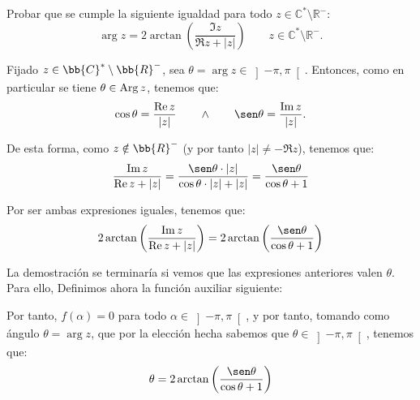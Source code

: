 \begin{ejercicio}
    Probar que se cumple la siguiente igualdad para todo $z \in \mathbb{C}^\ast \setminus \mathbb{R}^-$:
    \[
        \arg z = 2\arctan\left(\dfrac{\Im z}{\Re z + |z|}\right)\qquad z\in \mathbb{C}^\ast \setminus \mathbb{R}^-.
    \]

    Fijado $z\in \bb{C}^*\setminus \bb{R}^-$, sea $\theta=\arg z\in \left]-\pi,\pi\right[$. Entonces, como en particular se tiene $\theta\in\operatorname{Arg} z$, tenemos que:
    \begin{equation*}
        \cos\theta = \dfrac{\Re z}{|z|} \qquad \land \qquad \sen\theta = \dfrac{\Im z}{|z|}.
    \end{equation*}
    \begin{comment}
    \begin{equation*}
        \left\{
            \begin{array}{c}
                \cos\theta = \dfrac{\Re z}{|z|} \\ \land \\ \sen\theta = \dfrac{\Im z}{|z|}.
            \end{array}
        \right\}
        \Longleftrightarrow \theta\in \Arg z
    \end{equation*}
    \end{comment}

    De esta forma, como $z\notin \bb{R}^-$ (y por tanto $|z|\neq -\Re z$), tenemos que:
    \begin{align*}
        \dfrac{\Im z}{\Re z + |z|}
        = \dfrac{\sen\theta\cdot |z|}{\cos\theta\cdot |z| + |z|}
        = \dfrac{\sen\theta}{\cos\theta + 1}
    \end{align*}

    Por ser ambas expresiones iguales, tenemos que:
    \begin{equation*}
        2\arctan\left(\dfrac{\Im z}{\Re z + |z|}\right)=2\arctan\left(\dfrac{\sen\theta}{\cos\theta + 1}\right)
    \end{equation*}

    La demostración se terminaría si vemos que las expresiones anteriores valen $\theta$. Para ello, Definimos ahora la función auxiliar siguiente:
    \Func{f}{\left]-\pi,\pi\right[}{\bb{R}}{\alpha}{\alpha - 2\arctan\left(\dfrac{\sen\alpha}{\cos\alpha + 1}\right)}



    Por tanto, $f(\alpha)=0$ para todo $\alpha\in \left]-\pi,\pi\right[$, y por tanto, tomando como ángulo $\theta=\arg z$, que por la elección hecha sabemos que $\theta \in \left]-\pi,\pi\right[$, tenemos que: 
    \begin{equation*}
        \theta = 2\arctan\left(\dfrac{\sen\theta}{\cos\theta + 1}\right)
    \end{equation*}
\end{ejercicio}

